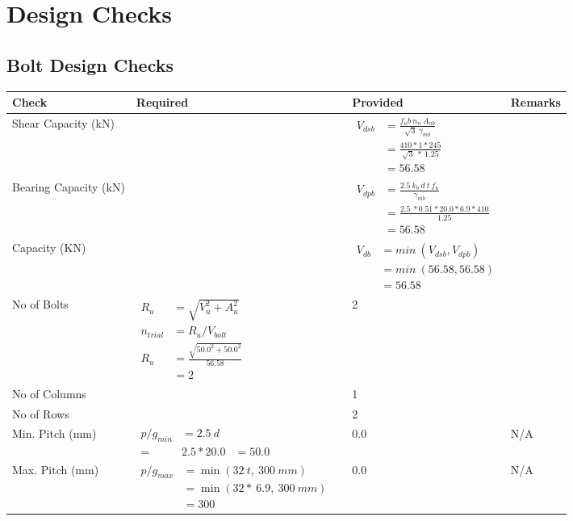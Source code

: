 \documentclass{article}%
\begin{document}
%
%
\section{Design Checks}%
\label{sec:DesignChecks}%
\subsection{Bolt Design Checks}%
\label{subsec:BoltDesignChecks}%
\renewcommand{\arraystretch}{1.2}%
\begin{longtable}{|p{4cm}|p{5cm}|p{5.5cm}|p{1.5cm}|}%
\hline%
\rowcolor{OsdagGreen}%
Check&Required&Provided&Remarks\\%
\hline%
\endhead%
\hline%
Shear Capacity (kN)&&$\begin{aligned}V_{dsb} &= \frac{f_ub ~n_n~ A_{nb}}{\sqrt{3} ~\gamma_{mb}}\\ &= \frac{410*1*245}{\sqrt{3}~*~1.25}\\ &= 56.58\end{aligned}$&\\%
\hline%
Bearing Capacity (kN)&&$\begin{aligned}V_{dpb} &= \frac{2.5~ k_b~ d~ t~ f_u}{\gamma_{mb}}\\ &= \frac{2.5~*0.51*20.0*6.9*410}{1.25}\\ &=56.58\end{aligned}$&\\%
\hline%
Capacity (KN)&&$\begin{aligned}V_{db} &= min~ (V_{dsb}, V_{dpb})\\ &= min~ (56.58,56.58)\\ &=56.58\end{aligned}$&\\%
\hline%
No of Bolts&$\begin{aligned}R_{u} &= \sqrt{V_u^2+A_u^2}\\ n_{trial} &= R_u/ V_{bolt}\\ R_{u} &= \frac{\sqrt{50.0^2+50.0^2}}{56.58}\\ &=2\end{aligned}$&2&\\%
\hline%
No of Columns&&1&\\%
\hline%
No of Rows&&2&\\%
\hline%
Min. Pitch (mm)&$\begin{aligned}p/g_{min}&= 2.5 ~ d&\\ =&2.5*20.0&=50.0\end{aligned}$&0.0&N/A\\%
\hline%
Max. Pitch (mm)&$\begin{aligned}p/g_{max} &=\min(32~t,~300~mm)&\\ &=\min(32 *~6.9,~ 300 ~mm)\\&=300\end{aligned}$&0.0&N/A\\%

\end{longtable}
\end{document}
